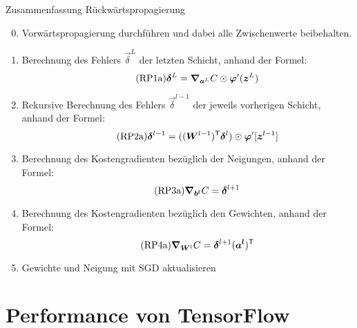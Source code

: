 \begin{appendices}
\begin{graybox}{Zusammenfassung Rückwärtspropagierung}
  \begin{enumerate}
    \setcounter{enumi}{-1}
  \item{Vorwärtspropagierung durchführen und dabei alle Zwischenwerte beibehalten.}
    \item{Berechnung des Fehlers $\vec{\delta}^L$ der letzten Schicht, anhand
        der Formel:
      \begin{equation}\tag{RP1a}
        \bm{\delta}^L = \bm{\nabla}_{\bm{a}^L}C \odot \bm{\varphi}'(\bm{z}^L)
      \end{equation}
      }
      \item{Rekursive Berechnung des Fehlers $\vec{\delta}^{l-1}$ der jeweils
          vorherigen Schicht, anhand der Formel:
          \begin{equation}\tag{RP2a}
            \bm{\delta}^{l-1} = ((\bm{W}^{l-1})^{\mathsf{T}} \bm{\delta}^l) \odot \bm{\varphi}'[\bm{z}^{l-1}]
          \end{equation}
        }
      \item{Berechnung des Kostengradienten bezüglich der Neigungen, anhand der Formel:
          \begin{equation}\tag{RP3a}
            \bm{\nabla}_{\bm{b^l}} C =  \bm{\delta}^{l+1}
          \end{equation}
        }
      \item{Berechnung des Kostengradienten bezüglich den Gewichten, anhand der Formel:
          \begin{equation}\tag{RP4a}
            \bm{\nabla}_{\bm{W}^l} C = \bm{\delta}^{l+1} (\bm{a^l})^{\mathsf{T}}
          \end{equation}
        }
      \item{Gewichte und Neigung mit SGD aktualisieren}
  \end{enumerate}
\end{graybox}

\para{}
\cite{Nielsen}
\cite{rojas}
\cite{ma:deep_learning}

\chapter{Performance von TensorFlow}\label{sec:anhang_tf}

\end{appendices}
